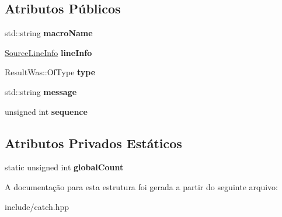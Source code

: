 \subsection*{Atributos Públicos}
\begin{DoxyCompactItemize}
\item 
std\+::string {\bfseries macro\+Name}\hypertarget{structCatch_1_1MessageInfo_a156ade4b3cc731f6ec7b542ae47ba8e3}{}\label{structCatch_1_1MessageInfo_a156ade4b3cc731f6ec7b542ae47ba8e3}

\item 
\hyperlink{structCatch_1_1SourceLineInfo}{Source\+Line\+Info} {\bfseries line\+Info}\hypertarget{structCatch_1_1MessageInfo_a985165328723e599696ebd8e43195cc5}{}\label{structCatch_1_1MessageInfo_a985165328723e599696ebd8e43195cc5}

\item 
Result\+Was\+::\+Of\+Type {\bfseries type}\hypertarget{structCatch_1_1MessageInfo_ae928b9117465c696e45951d9d0284e78}{}\label{structCatch_1_1MessageInfo_ae928b9117465c696e45951d9d0284e78}

\item 
std\+::string {\bfseries message}\hypertarget{structCatch_1_1MessageInfo_ab6cd06e050bf426c6577502a5c50e256}{}\label{structCatch_1_1MessageInfo_ab6cd06e050bf426c6577502a5c50e256}

\item 
unsigned int {\bfseries sequence}\hypertarget{structCatch_1_1MessageInfo_a7f4f57ea21e50160adefce7b68a781d6}{}\label{structCatch_1_1MessageInfo_a7f4f57ea21e50160adefce7b68a781d6}

\end{DoxyCompactItemize}
\subsection*{Atributos Privados Estáticos}
\begin{DoxyCompactItemize}
\item 
static unsigned int {\bfseries global\+Count}\hypertarget{structCatch_1_1MessageInfo_a250459555d236f9510a5afd78a6c1979}{}\label{structCatch_1_1MessageInfo_a250459555d236f9510a5afd78a6c1979}

\end{DoxyCompactItemize}


A documentação para esta estrutura foi gerada a partir do seguinte arquivo\+:\begin{DoxyCompactItemize}
\item 
include/catch.\+hpp\end{DoxyCompactItemize}
